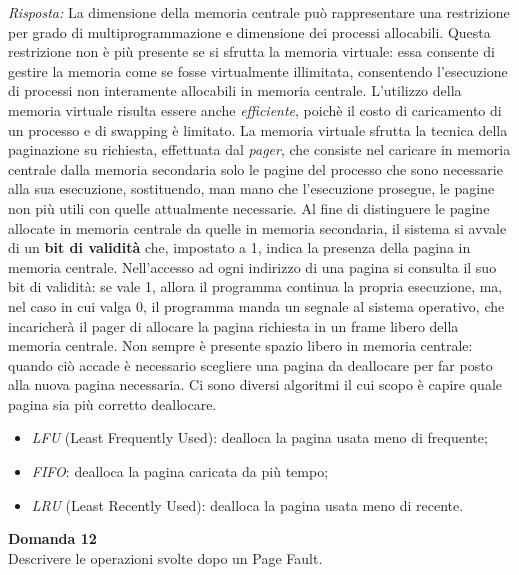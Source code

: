 \documentclass{article}
\newenvironment{problem}[2][Domanda]
    { \begin{mdframed}[backgroundcolor=gray!20] \textbf{#1 #2} \\}
    {  \end{mdframed}}
\newenvironment{solution}
    {\textit{Risposta:}}
    {}
\begin{document}
\begin{solution}
La dimensione della memoria centrale può rappresentare una restrizione per grado di multiprogrammazione e dimensione dei processi allocabili.
Questa restrizione non è più presente se si sfrutta la memoria virtuale: essa consente di gestire la memoria come se fosse virtualmente illimitata, consentendo l’esecuzione di processi non interamente allocabili in memoria centrale.
L’utilizzo della memoria virtuale risulta essere anche \textit{efficiente}, poichè il costo di caricamento di un processo e di swapping è limitato.
\newline
\newline
La memoria virtuale sfrutta la tecnica della paginazione su richiesta, effettuata dal \textit{pager}, che consiste nel caricare in memoria centrale dalla memoria secondaria solo le pagine del processo che sono necessarie alla sua esecuzione, sostituendo, man mano che l’esecuzione prosegue, le pagine non più utili con quelle attualmente necessarie.
\newline
Al fine di distinguere le pagine allocate in memoria centrale da quelle in memoria secondaria, il sistema si avvale di un \textbf{bit di validità} che, impostato a 1, indica la presenza della pagina in memoria centrale.
\newline
Nell’accesso ad ogni indirizzo di una pagina si consulta il suo bit di validità: se vale 1, allora il programma continua la propria esecuzione, ma, nel caso in cui valga 0, il programma manda un segnale al sistema operativo, che incaricherà il pager di allocare la pagina richiesta in un frame libero della memoria centrale.
\newline
Non sempre è presente spazio libero in memoria centrale: quando ciò accade è necessario scegliere una pagina da deallocare per far posto alla nuova pagina necessaria. 
\newline
Ci sono diversi algoritmi il cui scopo è capire quale pagina sia più corretto deallocare.
\begin{itemize}
    \item \emph{LFU} (Least Frequently Used): dealloca la pagina usata meno di frequente;
    \item \emph{FIFO}: dealloca la pagina caricata da più tempo;
    \item \emph{LRU} (Least Recently Used): dealloca la pagina usata meno di recente.
\end{itemize}
\end{solution}
\begin{problem}{12}
Descrivere le operazioni svolte dopo un Page Fault.
\end{problem}
\end{document}
